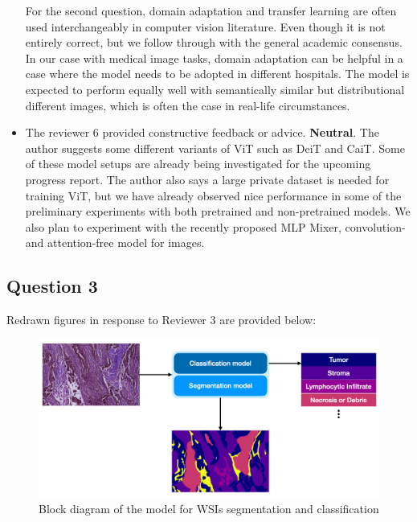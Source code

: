 \documentclass[rebuttal]{cvpr}
\begin{document}
\begin{itemize}
    For the second question, domain adaptation and transfer learning are often used interchangeably in computer vision literature. Even though it is not entirely correct, but we follow through with the general academic consensus. In our case with medical image tasks, domain adaptation can be helpful in a case where the model needs to be adopted in different hospitals. The model is expected to perform equally well with semantically similar but distributional different images, which is often the case in real-life circumstances.  
    
    \item The reviewer 6 provided constructive feedback or advice. \textbf{Neutral}. The author suggests some different variants of ViT such as DeiT and CaiT. Some of these model setups are already being investigated for the upcoming progress report. The author also says a large private dataset is needed for training ViT, but we have already observed nice performance in some of the preliminary experiments with both pretrained and non-pretrained models. We also plan to experiment with the recently proposed MLP Mixer, convolution- and attention-free model for images. 
\end{itemize}

\subsection{Question 3}
Redrawn figures in response to Reviewer 3 are provided below:

    \begin{figure}[ht]
    \begin{center}
       \includegraphics[width=0.8\linewidth]{media/Blockdiagram.png}
    \end{center}
       \caption{Block diagram of the model for WSIs segmentation and classification}
    \label{fig:seg+class}
    \end{figure}
    
\end{document}
